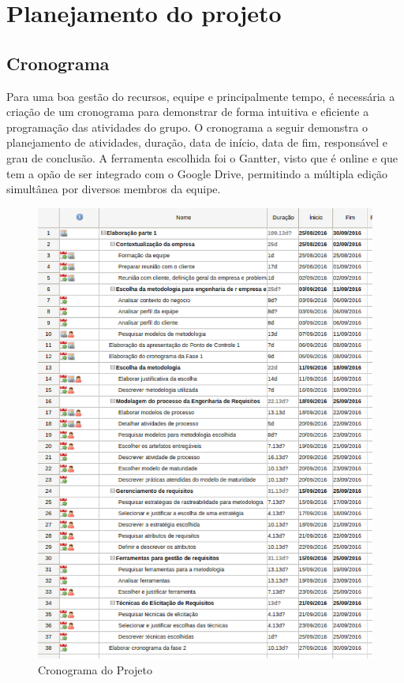 
\chapter[Planejamento do projeto]{Planejamento do projeto}


\section{\large{Cronograma}} 

\tab Para uma boa gestão do recursos, equipe e principalmente tempo, é necessária a criação de um cronograma para demonstrar de forma intuitiva e eficiente a programação das atividades do grupo. O cronograma a seguir demonstra o planejamento de atividades, duração, data de início, data de fim, responsável e grau de conclusão. A ferramenta escolhida foi o Gantter, visto que é online e que tem a opão de ser integrado com o Google Drive, permitindo a múltipla edição simultânea por diversos membros da equipe. \\

 


\begin{figure}[h]
	\centering
	\label{fig01}
		\includegraphics[keepaspectratio=true,scale=0.6]{figuras/cronogramamaior.eps}
	\caption{Cronograma do Projeto}
\end{figure}
